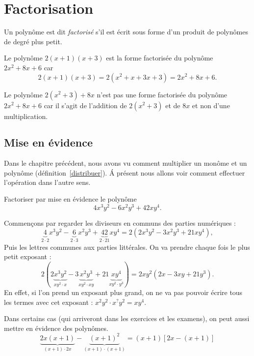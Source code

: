 \chapter{Factorisation}

\begin{definition}
Un polynôme est dit \emph{factorisé} s'il est écrit sous forme d'un produit de polynômes de degré plus petit.
\end{definition}

\begin{exemple}
Le polynôme $2(x+1)(x+3)$ est la forme factorisée du polynôme $2x^2 + 8x + 6$ car
$$
2(x+1)(x+3) = 2(x^2 + x + 3x + 3) = 2x^2 + 8x + 6.
$$

Le polynôme $2(x^2 +3) + 8x$ n'est pas une forme factorisée du polynôme $2x^2 + 8x + 6$ car il s'agit de l'addition de $2(x^2 + 3)$ et de $8x$ et non d'une multiplication.
\end{exemple}

\section{Mise en évidence}

Dans le chapitre précédent, nous avons vu comment multiplier un monôme et un polynôme (définition~\ref{distribuer}). \'A présent nous allons voir comment effectuer l'opération dans l'autre sens.

\begin{exemple}
Factoriser par mise en évidence le polynôme
$$
4x^3y^2 - 6 x^2y^3 + 42xy^4.
$$

Commençons par regarder les diviseurs en communs des parties numériques :
$$
\underbrace{4}_{2\cdot 2}x^3y^2 - \underbrace{6}_{2\cdot 3} x^2y^3 + \underbrace{42}_{2\cdot 21}xy^4
=2\left(2x^3y^2 - 3 x^2y^3 + 21xy^4\right),
$$
Puis les lettres communes aux parties littérales. On va prendre chaque fois le plus petit exposant :
$$
2\left(2\underbrace{x^3y^2}_{xy^2 \cdot x} - 3 \underbrace{x^2y^3}_{xy^2 \cdot xy} + 21\underbrace{xy^4}_{xy^2 \cdot y^3}\right) = 2xy^2\left(2x-3xy+21y^3\right).
$$
En effet, si l'on prend un exposant plus grand, on ne va pas pouvoir écrire tous les termes avec cet exposant : $x^2y^2 \cdot x^?y^2 = xy^4$.
\end{exemple}

\begin{remarque}
Dans certains cas (qui arriveront dans les exercices et les examens), on peut aussi mettre en évidence des polynômes.
$$
\underbrace{2x(x+1)}_{(x+1)\cdot 2x} - \underbrace{(x+1)^2}_{(x+1)\cdot(x+1)} = (x+1)\left[2x - (x+1) \right]
$$
\end{remarque}

